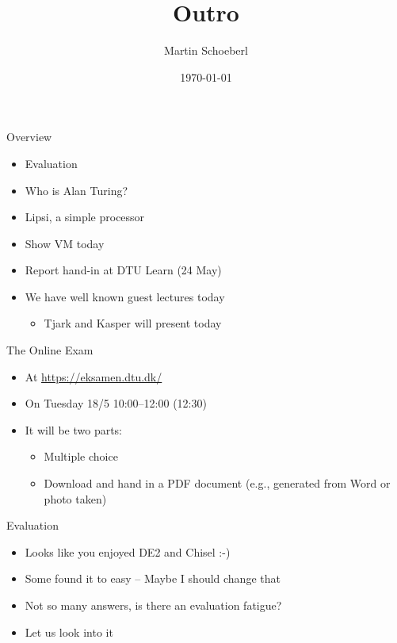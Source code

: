 

\newif\ifbook


\title{Outro}
\author{Martin Schoeberl}
\date{\today}



\begin{frame}
\titlepage
\end{frame}


\begin{frame}[fragile]{Overview}
\begin{itemize}
\item Evaluation
\item Who is Alan Turing?
\item Lipsi, a simple processor
\item Show VM today
\item Report hand-in at DTU Learn (24 May)
\item We have well known guest lectures today
\begin{itemize}
\item Tjark and Kasper will present today
\end{itemize}
\end{itemize}
\end{frame}


\begin{frame}[fragile]{The Online Exam}
\begin{itemize}
\item At \url{https://eksamen.dtu.dk/}
\item On Tuesday 18/5 10:00--12:00 (12:30)
\item It will be two parts:
\begin{itemize}
\item Multiple choice
\item Download and hand in a PDF document (e.g., generated from Word or photo taken)
\end{itemize}
\end{itemize}
\end{frame}


\begin{frame}[fragile]{Evaluation}
\begin{itemize}
\item Looks like you enjoyed DE2 and Chisel :-)
\item Some found it to easy -- Maybe I should change that
\item Not so many answers, is there an evaluation fatigue?
\item Let us look into it
\end{itemize}
\end{frame}

